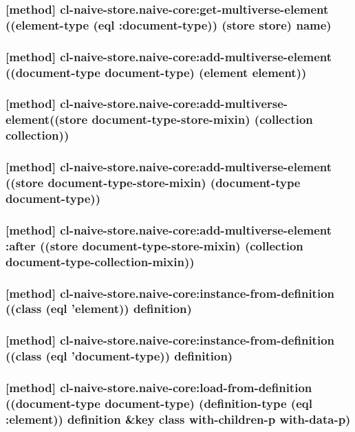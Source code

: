\documentclass[11pt]{article}
\begin{document}
\subsubsection{[method] cl-naive-store.naive-core:get-multiverse-element ((element-type (eql :document-type)) (store store) name)}
\label{sec:org89a6ad9}

\subsubsection{[method] cl-naive-store.naive-core:add-multiverse-element ((document-type document-type) (element element))}
\label{sec:orgc02f678}

\subsubsection{[method] cl-naive-store.naive-core:add-multiverse-element((store document-type-store-mixin) (collection collection))}
\label{sec:org6ab0b04}

\subsubsection{[method] cl-naive-store.naive-core:add-multiverse-element ((store document-type-store-mixin) (document-type document-type))}
\label{sec:org8b7eb51}

\subsubsection{[method] cl-naive-store.naive-core:add-multiverse-element :after ((store document-type-store-mixin) (collection document-type-collection-mixin))}
\label{sec:org886ae2f}

\subsubsection{[method] cl-naive-store.naive-core:instance-from-definition ((class (eql 'element)) definition)}
\label{sec:orgd4e25f0}

\subsubsection{[method] cl-naive-store.naive-core:instance-from-definition ((class (eql 'document-type)) definition)}
\label{sec:org50c1b02}

\subsubsection{[method] cl-naive-store.naive-core:load-from-definition ((document-type document-type) (definition-type (eql :element)) definition \&key class with-children-p with-data-p)}
\label{sec:orgfd39f3d}
\end{document}
